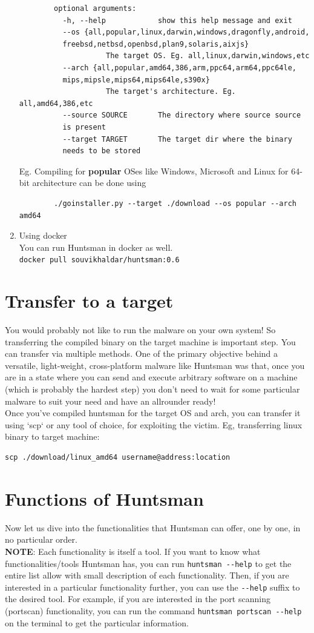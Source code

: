 \documentclass[12pt]{article}
\begin{document}
\begin{enumerate}
\begin{verbatim}
		optional arguments:
		  -h, --help            show this help message and exit
		  --os {all,popular,linux,darwin,windows,dragonfly,android,
		  freebsd,netbsd,openbsd,plan9,solaris,aixjs}
					The target OS. Eg. all,linux,darwin,windows,etc
		  --arch {all,popular,amd64,386,arm,ppc64,arm64,ppc64le,
		  mips,mipsle,mips64,mips64le,s390x}
					The target's architecture. Eg. all,amd64,386,etc
		  --source SOURCE       The directory where source source 
		  is present
		  --target TARGET       The target dir where the binary 
		  needs to be stored
		\end{verbatim}
	Eg. Compiling for \textbf{popular} OSes like Windows, Microsoft and Linux for 64-bit architecture can be done using
		\begin{verbatim}
		./goinstaller.py --target ./download --os popular --arch amd64
		\end{verbatim}

	\item Using docker\\
	You can run Huntsman in docker as well.\\
	\verb|docker pull souvikhaldar/huntsman:0.6|
\end{enumerate}

		\section{Transfer to a target}
You would probably not like to run the malware on your own system! So transferring the compiled binary on the target machine is important step. You can transfer via multiple methods. One of the primary objective behind a versatile, light-weight, cross-platform malware like Huntsman was that, once you are in a state where you can send and execute arbitrary software on a machine (which is probably the hardest step) you don't need to wait for some particular malware to suit your need and have an allrounder ready!\\
Once you've compiled huntsman for the target OS and arch, you can transfer it 
using `scp` or any tool of choice, for exploiting the victim.  
Eg, transferring linux binary to target machine:  
\begin{verbatim}
scp ./download/linux_amd64 username@address:location
\end{verbatim}

\section{Functions of Huntsman}
Now let us dive into the functionalities that Huntsman can offer, one by one, in no particular order.\\
\textbf{NOTE}: Each functionality is itself a tool. If you want to know what functionalities/tools Huntsman has, you can run \verb|huntsman --help| to get the entire list allow with small description of each functionality. Then, if you are interested in a particular functionality further, you can use the \verb|--help| suffix to the desired tool. For example, if you are interested in the port scanning (portscan) functionality, you can run the command \verb|huntsman portscan --help| on the terminal to get the particular information.  
\end{document}
